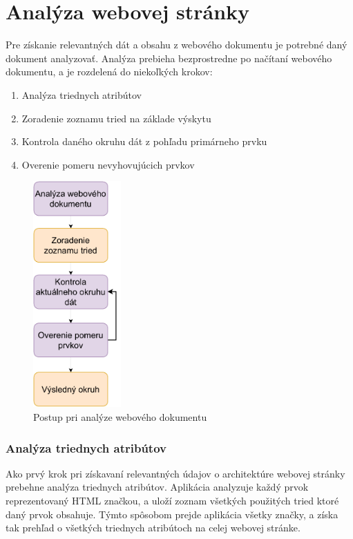  \newpage
 \section{Analýza webovej stránky}
 
 Pre získanie relevantných dát a obsahu z webového dokumentu je potrebné daný dokument analyzovať. Analýza prebieha bezprostredne po načítaní webového dokumentu, a je rozdelená do niekoľkých krokov:
 
 \begin{enumerate}
     \item Analýza triednych atribútov
     \item Zoradenie zoznamu tried na základe výskytu
     \item Kontrola daného okruhu dát z pohľadu primárneho prvku
     \item Overenie pomeru nevyhovujúcich prvkov
 \end{enumerate}
 
 \begin{figure}[hbt]
	\centering
	\includegraphics[width=0.3\textwidth]{obrazky-figures/analysis.pdf}
	\caption{Postup pri analýze webového dokumentu}
	\label{architecture}
\end{figure}

\newpage

\subsubsection{Analýza triednych atribútov}

Ako prvý krok pri získavaní relevantných údajov o architektúre webovej stránky prebehne analýza triednych atribútov. Aplikácia analyzuje každý prvok reprezentovaný HTML značkou, a uloží zoznam všetkých použitých tried ktoré daný prvok obsahuje. Týmto spôsobom prejde aplikácia všetky značky, a získa tak prehľad o všetkých triednych atribútoch na celej webovej stránke.


